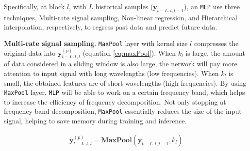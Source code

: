 
Specifically, at block $l$, with $L$ historical samples ($\mathbf{y}_{t-L:t, l-1}$), an \verb|MLP| use three techniques, Multi-rate signal sampling, Non-linear regression, and Hierarchical interpolation, respectively, to regress past data and predict future data.


\textbf{Multi-rate signal sampling}. \verb|MaxPool| layer with kernel size $l$ compresses the original data into $\mathbf{y}_{t-L:t, l}^{(p)}$ (equation \ref{eq:maxPool}). When $k_l$ is large, the amount of data considered in a sliding window is also large, the network will pay more attention to input signal with long wavelengths (low frequencies). When $k_l$ is small, the obtained features are of short wavelengths (high frequencies). By using \verb|MaxPool| layer, \verb|MLP| will be able to work on a certain frequency band, which helps to increase the efficiency of frequency decomposition. Not only stopping at frequency band decomposition, \verb|MaxPool| essentially reduces the size of the input signal, helping to save memory during training and inference.

\begin{align}
    \mathbf{y}_{t-L:t, l}^{(p)} = \mathbf{MaxPool}\left( \mathbf{y}_{t-L:t, l-1}, k_l \right)
    \label{eq:maxPool}
\end{align}


